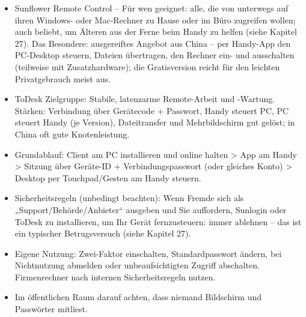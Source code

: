 \begin{itemize}
  \item Sunflower Remote Control – Für wen geeignet: alle, die von unterwegs auf ihren Windows- oder Mac-Rechner zu Hause oder im Büro zugreifen wollen; auch beliebt, um Älteren aus der Ferne beim Handy zu helfen (siehe Kapitel 27). Das Besondere: ausgereiftes Angebot aus China – per Handy-App den PC-Desktop steuern, Dateien übertragen, den Rechner ein- und ausschalten (teilweise mit Zusatzhardware); die Gratisversion reicht für den leichten Privatgebrauch meist aus.
  \item ToDesk Zielgruppe: Stabile, latenzarme Remote-Arbeit und -Wartung. Stärken: Verbindung über Gerätecode + Passwort, Handy steuert PC, PC steuert Handy (je Version), Dateitransfer und Mehrbildschirm gut gelöst; in China oft gute Knotenleistung.
  \item Grundablauf: Client am PC installieren und online halten > App am Handy > Sitzung über Geräte-ID + Verbindungspasswort (oder gleiches Konto) > Desktop per Touchpad/Gesten am Handy steuern.
  \item Sicherheitsregeln (unbedingt beachten): Wenn Fremde sich als „Support/Behörde/Anbieter“ ausgeben und Sie auffordern, Sunlogin oder ToDesk zu installieren, um Ihr Gerät fernzusteuern: immer ablehnen – das ist ein typischer Betrugsversuch (siehe Kapitel 27).
  \item Eigene Nutzung: Zwei-Faktor einschalten, Standardpasswort ändern, bei Nichtnutzung abmelden oder unbeaufsichtigten Zugriff abschalten. Firmenrechner nach internen Sicherheitsregeln nutzen.
  \item Im öffentlichen Raum darauf achten, dass niemand Bildschirm und Passwörter mitliest.
\end{itemize}


